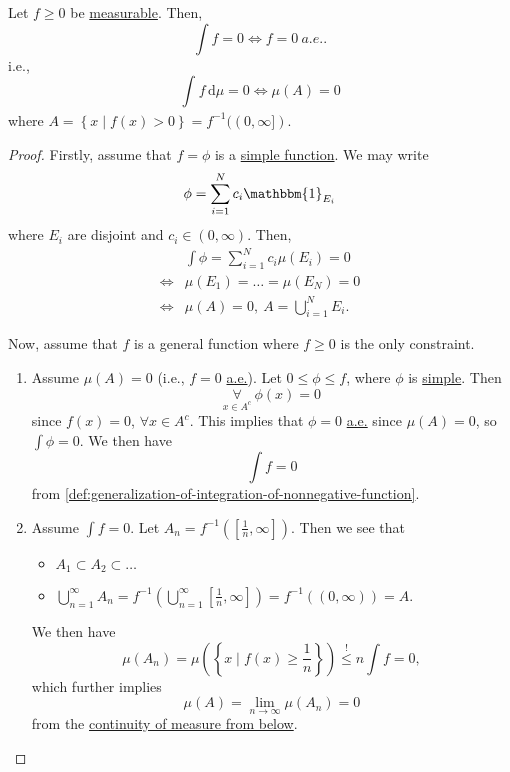 \begin{proposition}\label{prop:lec12-1}
	Let \(f\geq 0\) be \hyperref[def:measurable-function]{measurable}. Then,
	\[
		\int f = 0 \iff f = 0\ \hyperref[def:mu-almost-everywhere]{a.e.}.
	\]
	i.e.,
	\[
		\int_{}^{} f \,\mathrm{d}\mu = 0 \iff \mu (A) = 0
	\]
	where \(A = \left\{x \mid f(x)>0\right\} = f^{-1} ((0, \infty ])\).
\end{proposition}
\begin{proof}
	Firstly, assume that \(f = \phi \) is a \hyperref[def:simple-function]{simple function}. We may write
	\[
		\phi = \sum\limits_{i=1}^{N} c_{i}\mathbbm{1}_{E_{i}}
	\]
	where \(E_{i}\) are disjoint and \(c_{i}\in(0, \infty )\). Then,
	\[
		\begin{split}
			&\int \phi = \sum\limits_{i=1}^{N} c_{i}\mu (E_{i}) = 0\\
			\iff& \mu (E_1) = \ldots = \mu (E_{N}) = 0\\
			\iff& \mu (A) = 0,\ A = \bigcup\limits_{i=1}^{N} E_{i}.
		\end{split}
	\]

	\par Now, assume that \(f\) is a general function where \(f\geq 0\) is the only constraint.
	\begin{enumerate}
		\item Assume \(\mu (A) = 0\) (i.e., \(f = 0\) \hyperref[def:mu-almost-everywhere]{a.e.}). Let \(0\leq \phi \leq f\), where \(\phi\) is \hyperref[def:simple-function]{simple}. Then
		      \[
			      \underset{x\in A^{c} }{\forall }\ \phi (x) = 0
		      \]
		      since \(f(x) = 0\), \(\forall x\in A^{c} \). This implies that \(\phi = 0\) \hyperref[def:mu-almost-everywhere]{a.e.} since \(\mu (A) = 0\), so \(\int \phi =0\). We then have
		      \[
			      \int f = 0
		      \]
		      from \autoref{def:generalization-of-integration-of-nonnegative-function}.
		\item Assume \(\int f = 0\). Let \(A_{n} = f^{-1} \left(\left[\frac{1}{n}, \infty \right]\right)\). Then we see that
		      \begin{itemize}
			      \item \(A_1\subset A_2\subset \ldots  \)
			      \item \(\bigcup\limits_{n=1}^{\infty} A_{n} = f^{-1} \left(\bigcup\limits_{n=1}^{\infty} \left[\frac{1}{n}, \infty \right]\right) = f^{-1} ((0, \infty )) = A\).
		      \end{itemize}
		      We then have
		      \[
			      \mu (A_{n}) = \mu \left(\left\{x \mid f(x)\geq \frac{1}{n}\right\}\right) \overset{\hyperref[lma:Markov-inequality]{!}}{\leq }n \int f = 0,
		      \]
		      which further implies
		      \[
			      \mu (A) = \lim\limits_{n \to \infty} \mu (A_{n}) = 0
		      \]
		      from the \hyperref[thm:measure-space-continuity-from-below]{continuity of measure from below}.
	\end{enumerate}
\end{proof}

